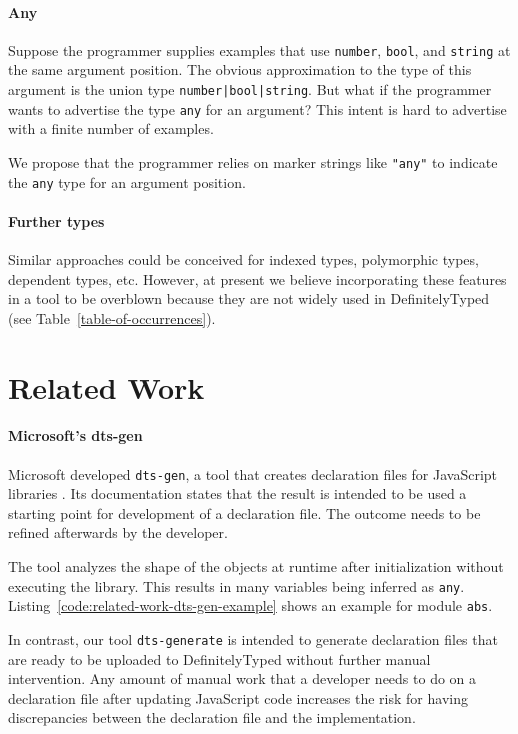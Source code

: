 \documentclass[english,cleveref,autoref,submission]{programming}
\newcommand{\coderef}[1]{Listing~\ref{#1}}
\begin{document}
\paragraph*{Any}
Suppose the programmer supplies examples that use \lstinline/number/, \lstinline/bool/, and
\lstinline/string/ at the same argument position. The obvious approximation to the type of
this argument is the union type \lstinline/number|bool|string/. But what if the programmer
wants to advertise the type \lstinline/any/ for an argument? This intent is hard to
advertise with a finite number of examples.

We propose that the programmer relies on marker strings like \lstinline/"any"/ to indicate
the \lstinline/any/ type for an argument position.

\paragraph*{Further types}
Similar approaches could be conceived for indexed types, polymorphic types, dependent
types, etc. However, at present we believe incorporating these features in a tool to be
overblown because they are not widely used in DefinitelyTyped (see
Table~\ref{table-of-occurrences}). 

\section{Related Work}
\label{sec:related-work}
\paragraph*{Microsoft's dts-gen}
Microsoft developed \texttt{dts-gen}, a tool that creates declaration files for
JavaScript libraries \cite{dts-gen}. Its documentation states that the result is 
intended to be used a starting point for development of a declaration file. The outcome
needs to be refined afterwards by the developer. 

The tool analyzes the shape of the objects at runtime after initialization without
executing the library. This results in many variables being inferred as
\lstinline[language={}]{any}. \coderef{code:related-work-dts-gen-example} shows an example
for module \lstinline[language={}]{abs}. 

In contrast, our tool \texttt{dts-generate} is intended to generate declaration files
that are ready to be uploaded to DefinitelyTyped without further manual intervention. Any
amount of manual work that a developer needs to do on a declaration file after updating
JavaScript code increases the risk for having discrepancies between the declaration file
and the implementation.
\end{document}

